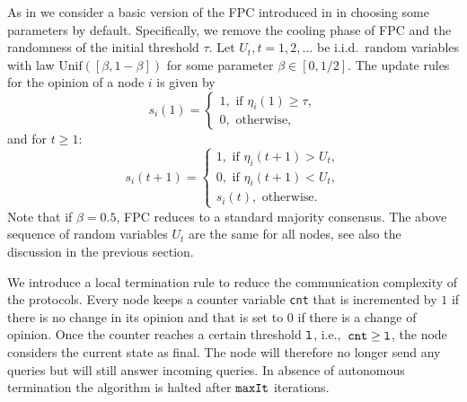 \documentclass[../main.tex]{subfiles}
\begin{document}
As in \cite{FPCsim2019} we consider a basic version of the FPC introduced in \cite{popov2019} in choosing some parameters by default. Specifically, we remove the cooling phase of FPC and the randomness of the initial threshold $\tau$. Let $U_{t}, t=1, 2,\ldots$ be i.i.d.~random variables with law $\mathrm{Unif}( [\beta, 1-\beta])$ for some parameter $\beta \in [0,1/2]$. The update rules for the opinion of a node $i$ is given by
\begin{equation*}
s_{i}(1)=\left\{ \begin{array}{ll}
1, \mbox{ if } \eta_{i}(1) \geq \tau, \\
0, \mbox{ otherwise,}
\end{array}\right. 
\end{equation*}
and for $t\geq 1$:
\begin{equation*}
s_{i}(t+1)=\left\{ \begin{array}{ll}
1, \mbox{ if } \eta_{i}(t+1) > U_{t}, \\
0, \mbox{ if } \eta_{i}(t+1) < U_{t}, \\
s_{i}(t), \mbox{ otherwise.}
\end{array}\right. 
\end{equation*}
Note that if $\beta=0.5$, FPC reduces to a standard majority consensus. The above sequence of random variables $U_t$ are the same for all nodes, see also the discussion in the previous section.

We introduce a local termination rule to reduce the communication complexity of the protocols. Every node keeps a counter variable \verb?cnt? that is incremented by $1$ if there is no change in its opinion and that is set to $0$ if there is a change of opinion. Once the counter reaches a certain threshold $\verb?l?$, i.e.,~$\verb?cnt?\geq \verb?l?$,  the node considers the current state as final. The node will therefore no longer send any queries but will still answer incoming queries. In absence of autonomous termination the algorithm is halted after $\verb?maxIt?$ iterations.  
\end{document}
